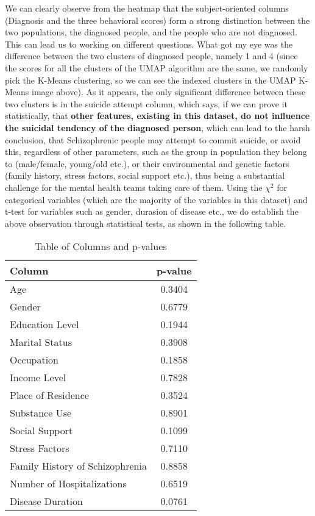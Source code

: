 \documentclass{article}
\begin{document}
\begin{figure}[H]
    \centering
\end{figure}

We can clearly observe from the heatmap that the subject-oriented columns (Diagnosis and the three behavioral scores) form a strong distinction between the two populations, the diagnosed people, and the people who are not diagnosed. This can lead us to working on different questions. What got my eye was the difference between the two clusters of diagnosed people, namely 1 and 4 (since the scores for all the clusters of the UMAP algorithm are the same, we randomly pick the K-Means clustering, so we can see the indexed clusters in the UMAP K-Means image above).
As it appears, the only significant difference between these two clusters is in the suicide attempt column, which says, if we can prove it statistically, that \textbf{other features, existing in this dataset, do not influence the suicidal tendency of the diagnosed person}, which can lead to the harsh conclusion, that Schizophrenic people may attempt to commit suicide, or avoid this, regardless of other parameters, such as the group in population they belong to (male/female, young/old etc.), or their environmental and genetic factors (family history, stress factors, social support etc.), thus being a substantial challenge for the mental health teams taking care of them. 
Using the $\chi^2$ for categorical variables (which are the majority of the variables in this dataset) and t-test for variables such as gender, durasion of disease etc., we do establish the above observation through statistical tests, as shown in the following table.
\begin{table}[ht]
\centering
\begin{tabular}{|l|c|}
\hline
\textbf{Column} & \textbf{p-value} \\
\hline
Age & 0.3404 \\
Gender & 0.6779 \\
Education Level & 0.1944 \\
Marital Status & 0.3908 \\
Occupation & 0.1858 \\
Income Level & 0.7828 \\
Place of Residence & 0.3524 \\
Substance Use & 0.8901 \\
Social Support & 0.1099 \\
Stress Factors & 0.7110 \\
Family History of Schizophrenia & 0.8858 \\
Number of Hospitalizations & 0.6519 \\
Disease Duration & 0.0761 \\
\hline
\end{tabular}
\caption{Table of Columns and p-values}
\end{table}
\end{document}
